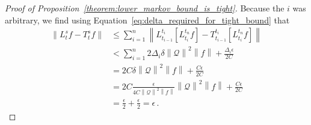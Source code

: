 \documentclass[10pt,a4paper]{paper}
\theoremstyle{definition}
\newcommand{\rateset}{\mathcal{Q}}
\newcommand{\lrate}{\underline{Q}}
\newcommand{\norm}[1]{\left\lVert #1 \right\rVert}
\begin{document}
\begin{proof}[Proof of Proposition~\ref{theorem:lower_markov_bound_is_tight}]
Because the $i$ was arbitrary, we find using Equation~\eqref{eq:delta_required_for_tight_bound} that
\begin{align*}
\norm{L_t^sf - T_t^sf} &\leq \sum_{i=1}^n \norm{L_{t_{i-1}}^{t_i}\left[L_{t_i}^{t_n}f\right] - T_{t_{i-1}}^{t_i}\left[L_{t_i}^{t_n}f\right]} \\
 &< \sum_{i=1}^n 2\Delta_i\delta\norm{\mathcal{Q}}^2\norm{f} + \frac{\Delta_i\epsilon}{2C} \\
 &= 2C\delta\norm{\mathcal{Q}}^2\norm{f} + \frac{C\epsilon}{2C} \\
 &= 2C\frac{\epsilon}{4C\norm{\rateset}^2\norm{f}}\norm{\mathcal{Q}}^2\norm{f} + \frac{C\epsilon}{2C} \\
 &= \frac{\epsilon}{2} + \frac{\epsilon}{2} = \epsilon\,.
\end{align*}
%

\end{proof}
\end{document}
